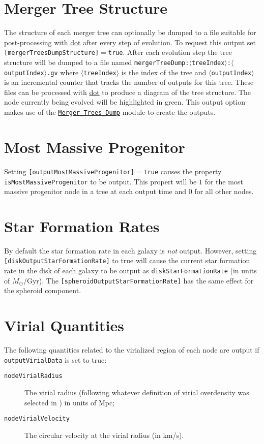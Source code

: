 \section{Merger Tree Structure}

The structure of each merger tree can optionally be dumped to a file suitable for post-processing with \href{http://www.graphviz.org/}{\sc dot} after every step of evolution. To request this output set {\tt [mergerTreesDumpStructure]}$=${\tt true}. After each evolution step the tree structure will be dumped to a file named {\tt mergerTreeDump:$\langle$treeIndex$\rangle$:$\langle$outputIndex$\rangle$.gv} where $\langle${\tt treeIndex}$\rangle$ is the index of the tree and $\langle${\tt outputIndex}$\rangle$ is an incremental counter that tracks the number of outputs for this tree. These files can be processed with \href{http://www.graphviz.org/}{\sc dot} to produce a diagram of the tree structure. The node currently being evolved will be highlighted in green. This output option makes use of the \hyperlink{objects.merger_trees.dump.F90:merger_trees_dump}{\tt Merger\_Trees\_Dump} module to create the outputs.

\section{Most Massive Progenitor}

Setting {\tt [outputMostMassiveProgenitor]}$=${\tt true} causes the property {\tt isMostMassiveProgenitor} to be output. This propert will be $1$ for the most massive progenitor node in a tree at each output time and $0$ for all other nodes.

\section{Star Formation Rates}

By default the star formation rate in each galaxy is \emph{not} output. However, setting {\tt [diskOutputStarFormationRate]} to true will cause the current star formation rate in the disk of each galaxy to be output as {\tt diskStarFormationRate} (in units of $M_\odot$/Gyr). The {\tt [spheroidOutputStarFormationRate]} has the same effect for the spheroid component.

\section{Virial Quantities}

The following quantities related to the virialized region of each node are output if {\tt outputVirialData} is set to true:
\begin{description}
 \item [{\tt nodeVirialRadius}] The virial radius (following whatever definition of virial overdensity was selected in \glc) in units of Mpc;
 \item [{\tt nodeVirialVelocity}] The circular velocity at the virial radius (in km/s).
\end{description}
